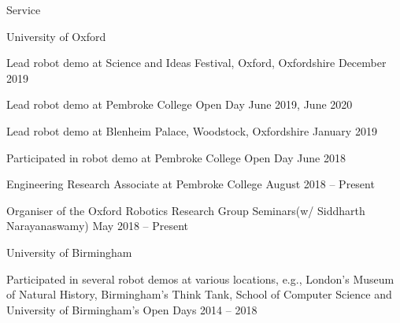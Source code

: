 
\begin{rSection}{Service}

\begin{rSubsection}{University of Oxford}{}{}{}
\item Lead robot demo at Science and Ideas Festival, Oxford, Oxfordshire \hfill December 2019
\item Lead robot demo at Pembroke College Open Day \hfill June 2019, June 2020
\item Lead robot demo at Blenheim Palace, Woodstock, Oxfordshire \hfill January 2019
\item Participated in robot demo at Pembroke College Open Day \hfill June 2018
\item Engineering Research Associate at Pembroke College \hfill August 2018 -- Present
\item Organiser of the Oxford Robotics Research Group Seminars\newline (w/ Siddharth Narayanaswamy) \hfill May 2018 -- Present
\end{rSubsection}


\begin{rSubsection}{University of Birmingham}{}{}{}
\item Participated in several robot demos at various locations, e.g., London's  Museum of Natural History, Birmingham's Think Tank,  School of  Computer Science and University of Birmingham's Open Days \hfill 2014 -- 2018
\end{rSubsection}




\end{rSection}
